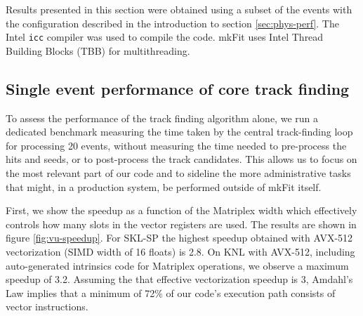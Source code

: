 \documentclass{webofc}
\def\mkfit{mkFit\xspace}
\def\stt#1{{\small\texttt{#1}}}
\begin{document}
Results presented in this section were obtained using a subset of the 
events with the configuration described in the introduction to section 
\ref{sec:phys-perf}. The Intel \stt{icc} compiler was used to compile the
code. \mkfit uses Intel Thread Building Blocks (TBB) for multithreading.


\subsection{Single event performance of core track finding}

To assess the performance of the track finding algorithm alone, we run a
dedicated benchmark measuring the time taken by the central track-finding loop
for processing 20 events, without measuring the time needed to pre-process the
hits and seeds, or to post-process the track candidates. This allows us to
focus on the most relevant part of our code and to sideline the more
administrative tasks that might, in a production system, be performed outside
of \mkfit itself.

First, we show the speedup as a function of the Matriplex width which
effectively controls how many slots in the vector registers are used. The
results are shown in figure \ref{fig:vu-speedup}. For SKL-SP the highest
speedup obtained with AVX-512 vectorization (SIMD width of 16 floats) is 2.8.
On KNL with AVX-512, including auto-generated intrinsics code for Matriplex
operations, we observe a maximum speedup of 3.2. Assuming the that effective
vectorization speedup is 3, Amdahl's Law implies that a minimum of 72\% of our
code's execution path consists of vector instructions.
\end{document}
